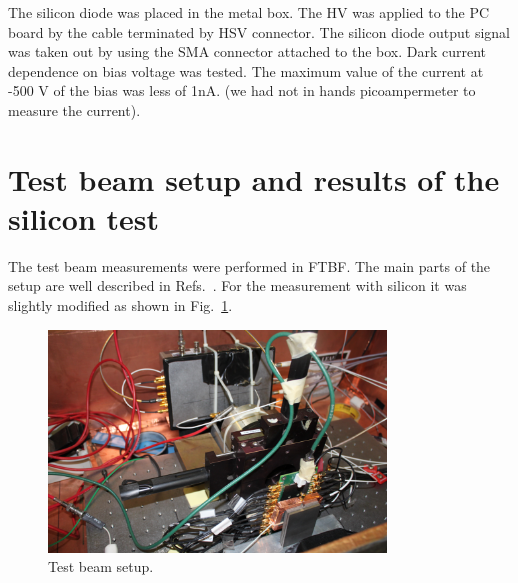 \documentclass[12pt]{article}
\begin{document}
The silicon diode was placed in the metal box. The HV was applied to the PC
board by the cable terminated by HSV connector. The silicon diode output signal
was taken out by using the SMA connector attached to the box. Dark current
dependence on bias voltage was tested. The maximum value of the current at -500
V of the bias was less of 1nA. (we had not in hands picoampermeter to measure
the current). \section{Test beam setup and results of the silicon test }
\label{sec:tbeam}

The test beam measurements were performed in FTBF. The main parts of the setup are well described in Refs.~\cite{Anderson:2015gha, MCPFastCaloNIMA, Ronzhin2015288,
Ronzhin201552}. For the measurement with silicon it was slightly modified as shown in Fig.~\ref{fig:SiliconPadTBeam}.

\begin{figure}[htbp] 
\centering
\includegraphics[width=0.8\textwidth]{plots/SiliconPadTestBeam.png} 
\caption{Test beam setup.} 
\label{fig:SiliconPadTBeam} 
\end{figure} 
\end{document}
